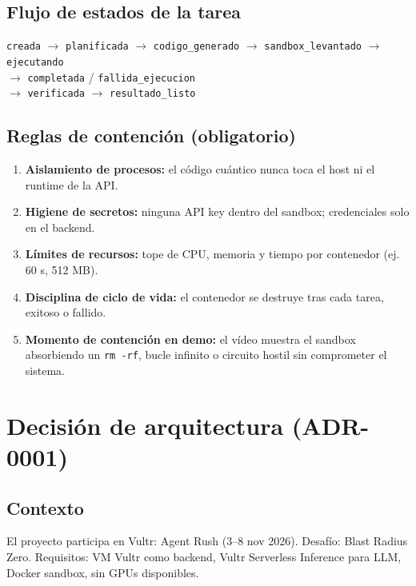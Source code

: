 \documentclass[11pt,a4paper]{article}
\begin{document}
\subsection{Flujo de estados de la tarea}

\begin{center}
\texttt{creada} $\rightarrow$ \texttt{planificada} $\rightarrow$ \texttt{codigo\_generado}
$\rightarrow$ \texttt{sandbox\_levantado} $\rightarrow$ \texttt{ejecutando} \\
$\rightarrow$ \texttt{completada} / \texttt{fallida\_ejecucion} \\
$\rightarrow$ \texttt{verificada} $\rightarrow$ \texttt{resultado\_listo}
\end{center}

\subsection{Reglas de contención (obligatorio)}

\begin{enumerate}
    \item \textbf{Aislamiento de procesos:} el código cuántico nunca toca el host ni el runtime de la API.
    \item \textbf{Higiene de secretos:} ninguna API key dentro del sandbox; credenciales solo en el backend.
    \item \textbf{Límites de recursos:} tope de CPU, memoria y tiempo por contenedor (ej. 60 s, 512 MB).
    \item \textbf{Disciplina de ciclo de vida:} el contenedor se destruye tras cada tarea, exitoso o fallido.
    \item \textbf{Momento de contención en demo:} el vídeo muestra el sandbox absorbiendo un \texttt{rm -rf}, bucle infinito o circuito hostil sin comprometer el sistema.
\end{enumerate}

\section{Decisión de arquitectura (ADR-0001)}

\subsection{Contexto}

El proyecto participa en Vultr: Agent Rush (3--8 nov 2026). Desafío: Blast Radius
Zero. Requisitos: VM Vultr como backend, Vultr Serverless Inference para LLM,
Docker sandbox, sin GPUs disponibles.
\end{document}
